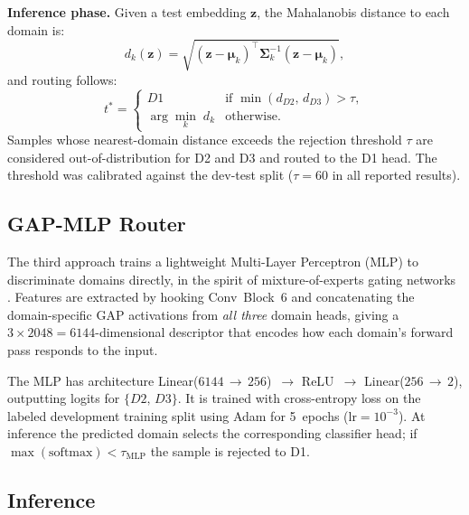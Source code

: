 \documentclass{article}
\begin{document}
\begin{sloppy}
\noindent\textbf{Inference phase.}
Given a test embedding $\mathbf{z}$, the Mahalanobis distance to each
domain is:
\begin{equation}
  \label{eqn:mahal_dist}
  d_k(\mathbf{z})
    = \sqrt{(\mathbf{z}-\boldsymbol{\mu}_k)^\top
            \boldsymbol{\Sigma}_k^{-1}
            (\mathbf{z}-\boldsymbol{\mu}_k)},
\end{equation}
and routing follows:
\begin{equation}
  \label{eqn:mahal_routing}
  t^* = \begin{cases}
    D1 & \text{if } \min(d_{D2},\,d_{D3}) > \tau, \\
    \arg\min_k\; d_k & \text{otherwise.}
  \end{cases}
\end{equation}
Samples whose nearest-domain distance exceeds the rejection threshold $\tau$
are considered out-of-distribution for D2 and D3 and routed to the D1 head.
The threshold was calibrated against the dev-test split
($\tau=60$ in all reported results).

\subsection{GAP-MLP Router}
\label{ssec:mlp_routing}

The third approach trains a lightweight Multi-Layer Perceptron (MLP) to
discriminate domains directly, in the spirit of mixture-of-experts gating
networks \cite{jacobs1991moe,fedus2022switch}.  Features are extracted by
hooking Conv~Block~6 and concatenating the domain-specific GAP activations
from \emph{all three} domain heads, giving a $3\times2048=6144$-dimensional
descriptor that encodes how each domain's forward pass responds to the input.

The MLP has architecture Linear($6144$\,$\rightarrow$\,$256$)~$\rightarrow$
ReLU~$\rightarrow$ Linear($256$\,$\rightarrow$\,$2$), outputting logits for
$\{D2,\,D3\}$.  It is trained with cross-entropy loss on the labeled
development training split using Adam for 5~epochs ($\text{lr}=10^{-3}$).
At inference the predicted domain selects the corresponding classifier head;
if $\max(\mathrm{softmax}) < \tau_{\mathrm{MLP}}$ the sample is rejected to D1.

\subsection{Inference}
\label{ssec:inference}


\end{sloppy}
\end{document}
